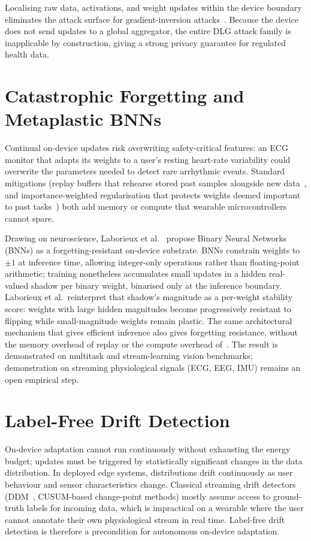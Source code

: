 \documentclass[conference]{IEEEtran}
\begin{document}
Localising raw data, activations, and weight updates within the
device boundary eliminates the attack surface for gradient-inversion
attacks~\cite{b8}. Because the device does not send updates to a
global aggregator, the entire DLG attack family is inapplicable
by construction, giving a strong privacy guarantee for regulated
health data.

\section{Catastrophic Forgetting and Metaplastic BNNs}
\label{sec:forgetting}

Continual on-device updates risk overwriting safety-critical
features: an ECG monitor that adapts its weights to a user's
resting heart-rate variability could overwrite the parameters
needed to detect rare arrhythmic events. Standard mitigations
(replay buffers that rehearse stored past samples alongside new
data~\cite{iCaRL}, and importance-weighted regularisation that
protects weights deemed important to past tasks~\cite{EWC}) both
add memory or compute that wearable microcontrollers cannot spare.

Drawing on neuroscience, Laborieux et al.~\cite{b9} propose Binary
Neural Networks (BNNs) as a forgetting-resistant on-device
substrate. BNNs constrain weights to $\pm 1$ at inference time,
allowing integer-only operations rather than floating-point
arithmetic; training nonetheless accumulates small updates in a
hidden real-valued shadow per binary weight, binarised only at the
inference boundary. Laborieux et al.\ reinterpret that shadow's
magnitude as a per-weight stability score: weights with large
hidden magnitudes become progressively resistant to flipping while
small-magnitude weights remain plastic. The same architectural
mechanism that gives efficient inference also gives forgetting
resistance, without the memory overhead of replay or the compute
overhead of~\cite{EWC}. The result is demonstrated on multitask
and stream-learning vision benchmarks; demonstration on streaming
physiological signals (ECG, EEG, IMU) remains an open empirical
step.

\section{Label-Free Drift Detection}
\label{sec:drift}

On-device adaptation cannot run continuously without exhausting
the energy budget; updates must be triggered by statistically
significant changes in the data distribution. In deployed edge
systems, distributions drift continuously as user behaviour and
sensor characteristics change.
Classical streaming drift detectors (DDM~\cite{DDM},
CUSUM-based change-point methods) mostly
assume access to ground-truth labels for incoming data, which is
impractical on a wearable where the user cannot annotate their own
physiological stream in real time. Label-free drift detection is
therefore a precondition for autonomous on-device adaptation.
\end{document}
